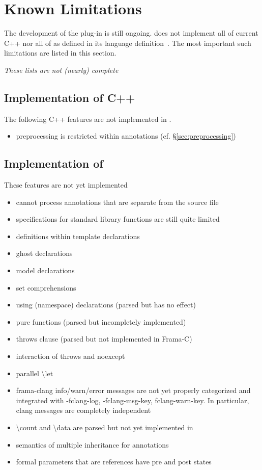 \chapter{Known Limitations}

The development of the \fclang plug-in is still ongoing.
\fclang does not implement all of current C++ nor all of 
\acslpp as defined in its language definition~\cite{acslpp}.
The most important such limitations are listed in this section.

\textit{These lists are not (nearly) complete}

\section{Implementation of C++}

The following C++ features are not implemented in \acslpp.
\begin{itemize}
\item preprocessing is restricted within \acslpp annotations (cf. \S\ref{sec:preprocessing})
\end{itemize}

\section{Implementation of \acslpp}

These \acslpp features are not yet implemented
\begin{itemize}

\item \fclang cannot process annotations that are separate from the source file
\item \acslpp specifications for standard \cpp library functions are still quite limited
\item \acslpp definitions within template declarations
\item ghost declarations
\item model declarations
\item set comprehensions
\item using (namespace) declarations (parsed but has no effect)
\item pure functions (parsed but incompletely implemented)
\item throws clause (parsed but not implemented in Frama-C)
\item interaction of throws and noexcept
\item parallel \textbackslash let
\item frama-clang info/warn/error messages are not yet properly categorized and integrated with -fclang-log, -fclang-msg-key, fclang-warn-key. In particular, clang messages are completely independent
\item \textbackslash count and \textbackslash data are parsed but not yet implemented in \framac
\item semantics of multiple inheritance for annotations
\item formal parameters that are references have pre and post states

\end{itemize}

